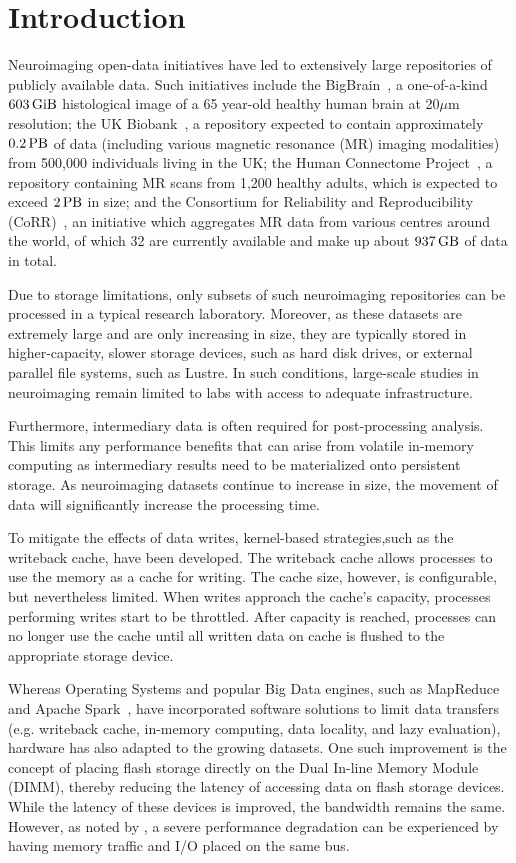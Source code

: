 \documentclass[conference]{IEEEtran}
\newcommand{\bigbrain}{BigBrain\xspace}
\begin{document}
\section{Introduction}
Neuroimaging open-data initiatives have led to extensively large repositories of
publicly available data. Such initiatives include the \bigbrain~\cite{BigBrain}, 
a one-of-a-kind $\SI{603}{\gibi\byte}$
histological image of a 65 year-old healthy human brain
at 20$\mu$m resolution; the UK Biobank~\cite{ukbiobank}, a repository expected to
contain approximately $\SI{0.2}{\peta\byte}$ of data (including various magnetic
resonance (MR) imaging modalities) from 500,000 individuals living in the UK;
the Human Connectome Project~\cite{HCP}, a repository containing MR scans from
1,200 healthy adults, which is expected to exceed $\SI{2}{\peta\byte}$ in size; 
and the Consortium for Reliability and Reproducibility (CoRR)~\cite{corr}, an
initiative which aggregates MR data from various centres around the world, 
of which 32 are currently available and make up about $\SI{937}{\giga\byte}$ of
data in total.

Due to storage limitations, only subsets of such neuroimaging repositories 
can be processed in a typical research laboratory. Moreover, as these datasets 
are extremely large and are only increasing in size, they are typically stored 
in higher-capacity, slower storage devices, such as hard disk drives, or external
parallel file systems, such as Lustre. In such conditions, large-scale 
studies in neuroimaging remain limited to labs with access to adequate 
infrastructure.

Furthermore, intermediary data is often required for post-processing analysis. This limits
any performance benefits that can arise from volatile in-memory computing as intermediary
results need to be materialized onto persistent storage. As neuroimaging datasets continue
to increase in size, the movement of data will significantly increase the processing time.

To mitigate the effects of data writes, kernel-based
strategies,such as the writeback cache, have been developed. The writeback cache
allows processes to use the memory as a cache for writing. The cache size,
however,
is configurable, but nevertheless limited. When writes approach the cache's capacity,
processes performing writes start to be throttled. After capacity is reached,
processes can no longer use the cache until all written data on cache is flushed
to the appropriate storage device.

Whereas Operating Systems and popular Big Data engines, such as MapReduce~\cite{mapreduce} and Apache Spark~\cite{spark}, have
incorporated software solutions to limit data transfers (e.g. writeback cache, in-memory computing,
data locality, and lazy evaluation), hardware has also adapted to the growing datasets.
One such improvement is the concept of placing flash storage directly on the Dual
In-line Memory Module (DIMM), thereby reducing the latency of accessing data on 
flash storage devices. While the latency of these devices is improved, the bandwidth
remains the same. However, as noted by \cite{nvdimms}, a severe performance degradation
can be experienced by having memory traffic and I/O placed on the same bus.
\end{document}
